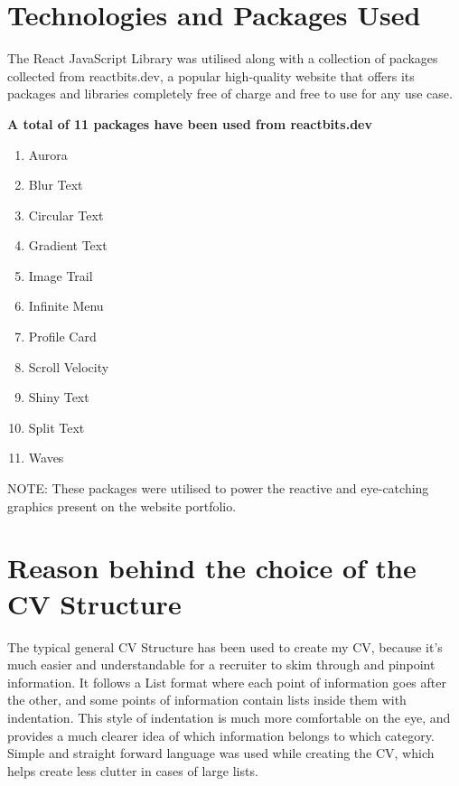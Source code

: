 \documentclass[12pt, letterpaper]{article}
\begin{document}
    \section{Technologies and Packages Used}
    The React JavaScript Library was utilised along with a collection of packages collected from reactbits.dev, a popular high-quality website that offers its packages and libraries completely free of charge and free to use for any use case.
    \begin{center}
        \textbf{A total of 11 packages have been used from reactbits.dev}
    \end{center}
    \begin{enumerate}
        \item Aurora
        \item Blur Text
        \item Circular Text
        \item Gradient Text
        \item Image Trail
        \item Infinite Menu
        \item Profile Card
        \item Scroll Velocity
        \item Shiny Text
        \item Split Text
        \item Waves
    \end{enumerate}
    NOTE: These packages were utilised to power the reactive and eye-catching graphics present on the website portfolio.

    \section{Reason behind the choice of the CV Structure}
    The typical general CV Structure has been used to create my CV, because it's much easier and understandable for a recruiter to skim through and pinpoint information.
    It follows a List format where each point of information goes after the other, and some points of information contain lists inside them with indentation.
    This style of indentation is much more comfortable on the eye, and provides a much clearer idea of which information belongs to which category.
    Simple and straight forward language was used while creating the CV, which helps create less clutter in cases of large lists.
\end{document}
